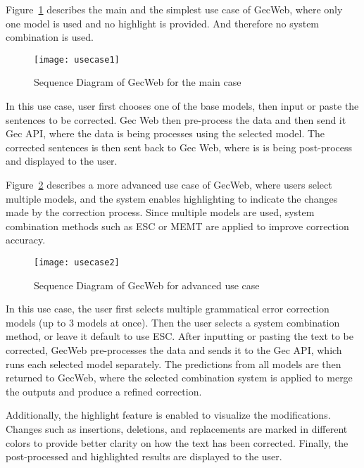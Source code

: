 Figure~\ref{fig:usecase1} describes the main and the simplest use case of GecWeb, where only one model is used and no highlight is provided.
And therefore no system combination is used.

\begin{figure}[htbp]
  \begin{center}
    \texttt{[image: usecase1]}
  \end{center}
  \caption{Sequence Diagram of GecWeb for the main case}\label{fig:usecase1}
\end{figure}

In this use case, user first chooses one of the base models, then input or paste the sentences to be corrected.
Gec Web then pre-process the data and then send it Gec API, where the data is being processes using the selected model.
The corrected sentences is then sent back to Gec Web, where is is being post-process and displayed to the user.

Figure~\ref{fig:usecase2} describes a more advanced use case of GecWeb, where users select multiple models, and the system enables highlighting to indicate the changes made by the correction process.
Since multiple models are used, system combination methods such as ESC or MEMT are applied to improve correction accuracy.

\begin{figure}[htbp]
  \begin{center}
    \texttt{[image: usecase2]}
  \end{center}
  \caption{Sequence Diagram of GecWeb for advanced use case}\label{fig:usecase2}
\end{figure}

In this use case, the user first selects multiple grammatical error correction models (up to 3 models at once).
Then the user selects a system combination method, or leave it default to use ESC.
After inputting or pasting the text to be corrected, GecWeb pre-processes the data and sends it to the Gec API, which runs each selected model separately.
The predictions from all models are then returned to GecWeb, where the selected combination system is applied to merge the outputs and produce a refined correction.

Additionally, the highlight feature is enabled to visualize the modifications.
Changes such as insertions, deletions, and replacements are marked in different colors to provide better clarity on how the text has been corrected.
Finally, the post-processed and highlighted results are displayed to the user.

